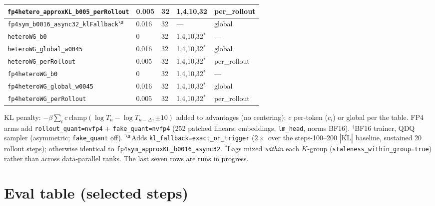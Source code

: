 \documentclass[11pt]{amsart}
\newcommand{\KL}{\mathrm{KL}}
\begin{document}
\begin{center}
\begin{tabular}{lllll}
\texttt{fp4hetero\_approxKL\_b005\_perRollout} & 0.005 & 32 & 1,4,10,32 & per\_rollout \\
\midrule
\texttt{fp4sym\_b0016\_async32\_klFallback}$^{\S}$ & 0.016 & 32 & --- & global \\
\texttt{heteroWG\_b0} & 0 & 32 & 1,4,10,32$^{\ast}$ & --- \\
\texttt{heteroWG\_global\_w0045} & 0.016 & 32 & 1,4,10,32$^{\ast}$ & global \\
\texttt{heteroWG\_perRollout} & 0.005 & 32 & 1,4,10,32$^{\ast}$ & per\_rollout \\
\texttt{fp4heteroWG\_b0} & 0 & 32 & 1,4,10,32$^{\ast}$ & --- \\
\texttt{fp4heteroWG\_global\_w0045} & 0.016 & 32 & 1,4,10,32$^{\ast}$ & global \\
\texttt{fp4heteroWG\_perRollout} & 0.005 & 32 & 1,4,10,32$^{\ast}$ & per\_rollout \\
\bottomrule
\end{tabular}
\end{center}

KL penalty: $-\beta \sum_t c\,\mathrm{clamp}(\log T_n - \log T_{n-\Delta},
\pm 10)$ added to advantages (no centering); $c$ per-token ($c_i$) or global
per the table. FP4 arms add \texttt{rollout\_quant=nvfp4} +
\texttt{fake\_quant=nvfp4} (252 patched linears; embeddings,
\texttt{lm\_head}, norms BF16). $^{\dagger}$BF16 trainer, QDQ sampler
(asymmetric; \texttt{fake\_quant} off). $^{\S}$Adds
\texttt{kl\_fallback=exact\_on\_trigger} ($2\times$ over the steps-100--200
$|\overline{\KL}|$ baseline, sustained 20 rollout steps); otherwise identical
to \texttt{fp4sym\_approxKL\_b0016\_async32}. $^{\ast}$Lags mixed \emph{within}
each $K$-group (\texttt{staleness\_within\_group=true}) rather than across
data-parallel ranks. The last seven rows are runs in progress.

\section{Eval table (selected steps)}
\end{document}
